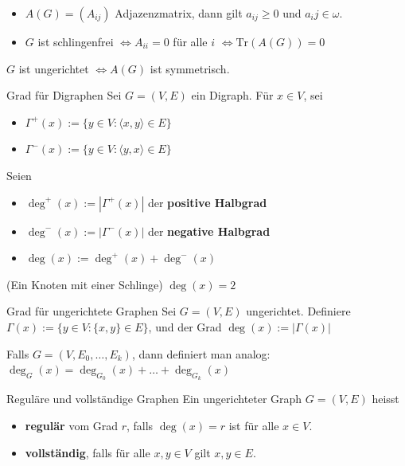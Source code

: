 \documentclass[12pt]{article}
\begin{document}
\begin{remark}{}{}
    \begin{itemize}
        \item $A(G) = (A_{ij})$ Adjazenzmatrix, dann gilt $a_{ij} \geq 0$ und $a_ij \in \omega$.
        \item $G$ ist schlingenfrei $\iff A_{ii} = 0$ für alle $i$ $ \iff \mathrm{Tr}(A(G)) = 0$
    \end{itemize}
\end{remark}

\begin{remark}{}{}
    $G$ ist ungerichtet $\iff A(G)$ ist symmetrisch.
\end{remark}

\begin{definition}{Grad für Digraphen}{}
    Sei $G = (V, E)$ ein Digraph. Für $x \in V$, sei 
    \begin{itemize}
        \item $\Gamma^+(x) := \{ y \in V : \langle x, y \rangle \in E \}$
        \item $\Gamma^-(x) := \{ y \in V : \langle y, x \rangle \in E \}$
    \end{itemize}
    Seien
    \begin{itemize}
        \item $\deg^+(x) := |\Gamma^+(x)|$ der \textbf{positive Halbgrad}
        \item $\deg^-(x) := |\Gamma^-(x)|$ der \textbf{negative Halbgrad}
        \item $\deg(x) := \deg^+(x) + \deg^-(x)$
    \end{itemize}
\end{definition}

\begin{example}{}{}
    (Ein Knoten mit einer Schlinge) $\deg(x) = 2$
\end{example}

\begin{definition}{Grad für ungerichtete Graphen}{}
    Sei $G = (V, E)$ ungerichtet. Definiere $\Gamma(x) := \{y \in V : \{x, y\} \in E\}$, und der Grad $\deg(x) := |\Gamma(x)|$

    Falls $G = (V, E_0,\dots,E_k)$, dann definiert man analog: $\deg_G(x) = \deg_{G_0}(x) + \dots + \deg_{G_k}(x)$
\end{definition}

\begin{definition}{Reguläre und vollständige Graphen}{}
    Ein ungerichteter Graph $G = (V, E)$ heisst
    \begin{itemize}
        \item \textbf{regulär} vom Grad $r$, falls $\deg(x)=r$ ist für alle $x \in V$.
        \item \textbf{vollständig}, falls für alle $x, y \in V$ gilt ${x, y} \in E$.
    \end{itemize}
\end{definition}
\end{document}
